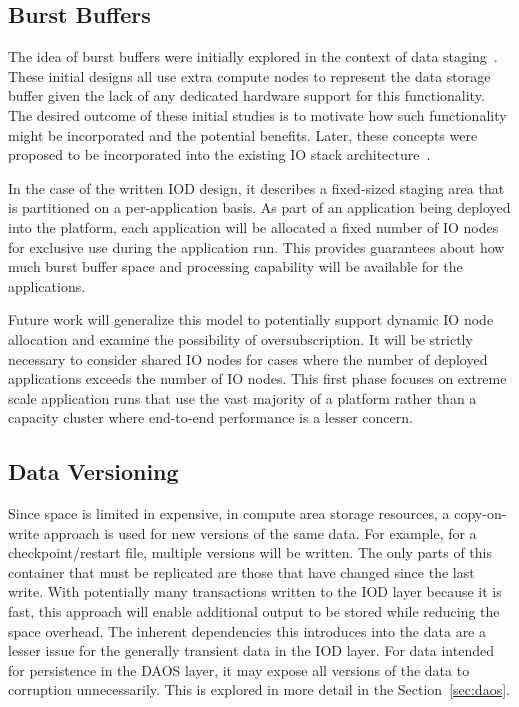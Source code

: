 \documentclass[conference]{IEEEtran} \pdfpagewidth=8.5in
\begin{document}
\subsection{Burst Buffers}
\label{sec:burst}

The idea of burst buffers were initially explored in the context of data
staging~\cite{abbasi:2007:datatap,Abbasi:2009:datatap,nisar:2008:staging,zheng:2010:predata}.
These initial designs all use extra compute nodes to represent the data storage
buffer given the lack of any dedicated hardware support for this functionality.
The desired outcome of these initial studies is to motivate how such
functionality might be incorporated and the potential benefits.  Later, these
concepts were proposed to be incorporated into the existing IO stack
architecture~\cite{nowoczynski:2008:zest,bent:2012:challenges,bent:2012:burst-buffer}.

In the case of the written IOD design, it describes a fixed-sized staging area
that is partitioned on a per-application basis. As part of an application
being deployed into the platform, each application will be allocated a fixed
number of IO nodes for exclusive use during the application run. This provides
guarantees about how much burst buffer space and processing capability will be
available for the applications.

Future work will generalize this model to potentially support dynamic IO node
allocation and examine the possibility of oversubscription. It will be strictly
necessary to consider shared IO nodes for cases where the number of deployed
applications exceeds the number of IO nodes.  This first phase focuses on
extreme scale application runs that use the vast majority of a platform rather
than a capacity cluster where end-to-end performance is a lesser concern.

\subsection{Data Versioning}

Since space is limited in expensive, in compute area storage resources, a
copy-on-write approach is used for new versions of the same data. For example,
for a checkpoint/restart file, multiple versions will be written. The only
parts of this container that must be replicated are those that have changed
since the last write. With potentially many transactions written to the IOD
layer because it is fast, this approach will enable additional output to be
stored while reducing the space overhead. The inherent dependencies this
introduces into the data are a lesser issue for the generally transient data
in the IOD layer. For data intended for persistence in the DAOS layer, it may
expose all versions of the data to corruption unnecessarily. This is explored
in more detail in the Section~\ref{sec:daos}.
\end{document}
